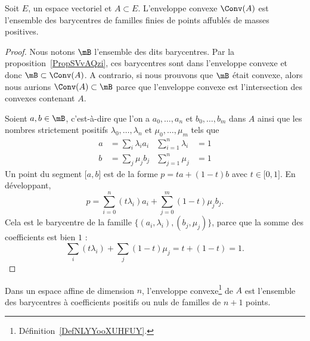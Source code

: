 \begin{proposition} \label{PropYHMTmZX}
    Soit \( E\), un espace vectoriel et \( A\subset E\). L'enveloppe convexe \( \Conv(A)\) est l'ensemble des barycentres de familles finies de points affublés de masses positives.
\end{proposition}

\begin{proof}
    Nous notons \( \mB\) l'ensemble des dits barycentres. Par la proposition~\ref{PropSVvAQzi}, ces barycentres sont dans l'enveloppe convexe et donc \( \mB\subset\Conv(A)\). A contrario, si nous prouvons que \( \mB\) était convexe, alors nous aurions \( \Conv(A)\subset\mB\) parce que l'enveloppe convexe est l'intersection des convexes contenant $A$.

    Soient \( a,b\in\mB\), c'est-à-dire que l'on a \( a_0,\ldots, a_n\) et \( b_0,\ldots, b_m\) dans \( A\) ainsi que les nombres strictement positifs \( \lambda_0,\ldots, \lambda_n\) et \( \mu_0,\ldots, \mu_m\) tels que
    \begin{subequations}
        \begin{align}
            a&=\sum_i\lambda_ia_i       & \sum_{i=1}^n\lambda_i&=1\\
            b&=\sum_j\mu_jb_j           &\sum_{j=1}^n\mu_j&=1
        \end{align}
    \end{subequations}
    Un point du segment \( \mathopen[ a , b \mathclose]\) est de la forme \( p=ta+(1-t)b\) avec \( t\in \mathopen[ 0 , 1 \mathclose]\). En développant,
    \begin{equation}
        p=\sum_{i=0}^n(t\lambda_i)a_i+\sum_{j=0}^m(1-t)\mu_jb_j.
    \end{equation}
    Cela est le barycentre de la famille \( \{ (a_i,\lambda_i),(b_j,\mu_j) \}\), parce que la somme des coefficients est bien \( 1\) :
    \begin{equation}
        \sum_i(t\lambda_i)+\sum_j(1-t)\mu_j=t+(1-t)=1.
    \end{equation}
\end{proof}


\begin{theorem} \label{ThoJLDjXLe}
    Dans un espace affine de dimension \( n\), l'enveloppe convexe\footnote{Définition~\ref{DefNLYYooXUHFUY}.} de \( A\) est l'ensemble des barycentres à coefficients positifs ou nuls de familles de \( n+1\) points.
\end{theorem}

